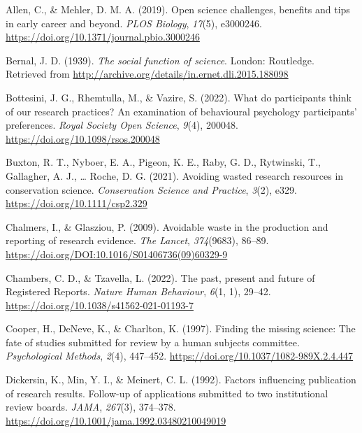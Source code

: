 \documentclass[
  ,man, a4paper,floatsintext]{apa6}
\newlength{\cslhangindent}
\newenvironment{CSLReferences}[2] %
 {\begin{list}{}{%
  \setlength{\itemindent}{0pt}
  \setlength{\leftmargin}{0pt}
  \setlength{\parsep}{0pt}
  \ifodd #1
   \setlength{\leftmargin}{\cslhangindent}
   \setlength{\itemindent}{-1\cslhangindent}
  \fi
  \setlength{\itemsep}{#2\baselineskip}}}
 {\end{list}}
\begin{document}
\label{refs}
\begin{CSLReferences}{1}{0}
Allen, C., \& Mehler, D. M. A. (2019). Open science challenges, benefits and tips in early career and beyond. \emph{PLOS Biology}, \emph{17}(5), e3000246. \url{https://doi.org/10.1371/journal.pbio.3000246}

Bernal, J. D. (1939). \emph{The social function of science}. London: Routledge. Retrieved from \url{http://archive.org/details/in.ernet.dli.2015.188098}

Bottesini, J. G., Rhemtulla, M., \& Vazire, S. (2022). What do participants think of our research practices? {An} examination of behavioural psychology participants' preferences. \emph{Royal Society Open Science}, \emph{9}(4), 200048. \url{https://doi.org/10.1098/rsos.200048}

Buxton, R. T., Nyboer, E. A., Pigeon, K. E., Raby, G. D., Rytwinski, T., Gallagher, A. J., \ldots{} Roche, D. G. (2021). Avoiding wasted research resources in conservation science. \emph{Conservation Science and Practice}, \emph{3}(2), e329. \url{https://doi.org/10.1111/csp2.329}

Chalmers, I., \& Glasziou, P. (2009). Avoidable waste in the production and reporting of research evidence. \emph{The Lancet}, \emph{374}(9683), 86--89. \url{https://doi.org/DOI:10.1016/S01406736(09)60329-9}

Chambers, C. D., \& Tzavella, L. (2022). The past, present and future of {Registered Reports}. \emph{Nature Human Behaviour}, \emph{6}(1, 1), 29--42. \url{https://doi.org/10.1038/s41562-021-01193-7}

Cooper, H., DeNeve, K., \& Charlton, K. (1997). Finding the missing science: {The} fate of studies submitted for review by a human subjects committee. \emph{Psychological Methods}, \emph{2}(4), 447--452. \url{https://doi.org/10.1037/1082-989X.2.4.447}

Dickersin, K., Min, Y. I., \& Meinert, C. L. (1992). Factors influencing publication of research results. {Follow-up} of applications submitted to two institutional review boards. \emph{JAMA}, \emph{267}(3), 374--378. \url{https://doi.org/10.1001/jama.1992.03480210049019}


\end{CSLReferences}
\end{document}
